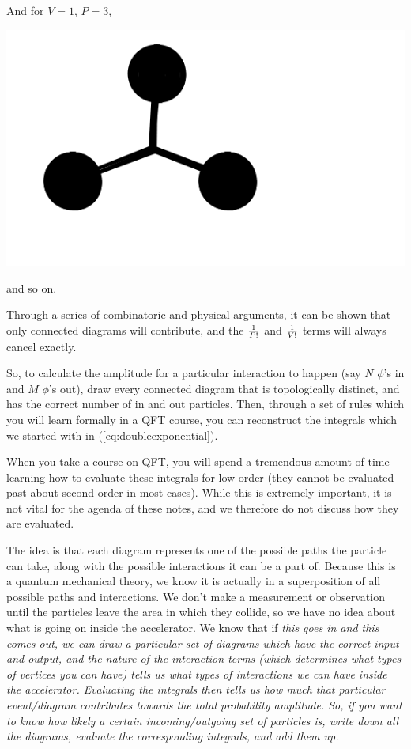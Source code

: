\documentclass[12pt,epsf]{article}
\begin{document}
And for $V=1$, $P=3$,
\begin{center}
\includegraphics[scale = .2]{feynmandiagram7.png}
\end{center}
and so on.  

Through a series of combinatoric and physical arguments, it can be
shown that only connected diagrams will contribute, and the ${1\over
P!}$ and ${1\over V!}$ terms will always cancel exactly.  

So, to calculate the amplitude for a particular interaction to happen
(say $N$ $\phi$'s in and $M$ $\phi$'s out), draw every connected
diagram that is topologically distinct, and has the correct number of
in and out particles.  Then, through a set of rules which you will
learn formally in a QFT course, you can reconstruct the integrals
which we started with in (\ref{eq:doubleexponential}).	

When you take a course on QFT, you will spend a tremendous amount of
time learning how to evaluate these integrals for low order (they
cannot be evaluated past about second order in most cases).  While this
is extremely important, it is not vital for the agenda of these notes,
and we therefore do not discuss how they are evaluated.  

The idea is that each diagram represents one of the possible paths the
particle can take, along with the possible interactions it can be a
part of.  Because this is a quantum mechanical theory, we know it is
actually in a superposition of all possible paths and interactions.  We
don't make a measurement or observation until the particles leave the
area in which they collide, so we have no idea about what is going on
inside the accelerator.  We know that if \it this \rm goes in and \it
this \rm comes out, we can draw a particular set of diagrams which have
the correct input and output, and the nature of the interaction terms
(which determines what types of vertices you can have) tells us what
types of interactions we can have inside the accelerator.  Evaluating
the integrals then tells us how much that particular event/diagram
contributes towards the total probability amplitude.  So, if you want
to know how likely a certain incoming/outgoing set of particles is,
write down all the diagrams, evaluate the corresponding integrals, and
add them up.  
\end{document}
